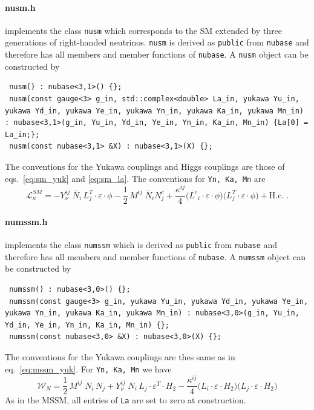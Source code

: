 \documentclass[11pt,a4paper]{article}
\begin{document}
\paragraph{nusm.h}
implements the class \texttt{nusm} which corresponds to the SM extended by three generations of right-handed neutrinos.
\texttt{nusm} is derived as \texttt{public} from \texttt{nubase} and therefore has all members and member functions of \texttt{nubase}. A \texttt{nusm} object can be constructed by
\begin{lstlisting}
 nusm() : nubase<3,1>() {};
 nusm(const gauge<3> g_in, std::complex<double> La_in, yukawa Yu_in, yukawa Yd_in, yukawa Ye_in, yukawa Yn_in, yukawa Ka_in, yukawa Mn_in) : nubase<3,1>(g_in, Yu_in, Yd_in, Ye_in, Yn_in, Ka_in, Mn_in) {La[0] = La_in;};
 nusm(const nubase<3,1> &X) : nubase<3,1>(X) {};
\end{lstlisting}
The conventions for the Yukawa couplings and Higgs couplings are those of eqs.~\eqref{eq:sm_yuk} and \eqref{eq:sm_la}. The conventions for \texttt{Yn, Ka, Mn} are
\begin{equation}\label{eq:sm_nu}
  \mathcal{L}_{\kappa}^{SM} = - Y_\nu^{ij}\; \overline{N}_i\, L_j^T \cdot \varepsilon \cdot \phi -\frac{1}{2}\, M^{ij}\; \overline{N}_i N^c_j  + \frac{\kappa^{ij}}{4} \bigl(\overline{L^c}_i\cdot \varepsilon \cdot \phi \bigr) \bigl(L_j^T\cdot \varepsilon \cdot \phi \bigr) + \mathrm{H.c.} \;.
\end{equation}

\paragraph{numssm.h}
implements the class \texttt{numssm} which is derived as \texttt{public} from \texttt{nubase} and therefore has all members and member functions of \texttt{nubase}. A \texttt{numssm} object can be constructed by
\begin{lstlisting}
 numssm() : nubase<3,0>() {};
 numssm(const gauge<3> g_in, yukawa Yu_in, yukawa Yd_in, yukawa Ye_in, yukawa Yn_in, yukawa Ka_in, yukawa Mn_in) : nubase<3,0>(g_in, Yu_in, Yd_in, Ye_in, Yn_in, Ka_in, Mn_in) {};
 numssm(const nubase<3,0> &X) : nubase<3,0>(X) {};
\end{lstlisting}
The conventions for the Yukawa couplings are thes same as in eq.~\eqref{eq:mssm_yuk}. For \texttt{Yn, Ka, Mn} we have
\begin{equation} \label{eq:mssm_nu}
    \mathcal{W}_{N} = \frac{1}{2}\, M^{ij}\; N_i\, N_j + Y_\nu^{ij}\; N_i\, L_j \cdot \varepsilon^T \cdot H_2 -\frac{\kappa^{ij}}{4} \bigl(L_i\cdot \varepsilon \cdot H_2\bigr) \bigl(L_j\cdot \varepsilon \cdot H_2\bigr)
\end{equation}
As in the MSSM, all entries of \texttt{La} are set to zero at construction.
\end{document}
